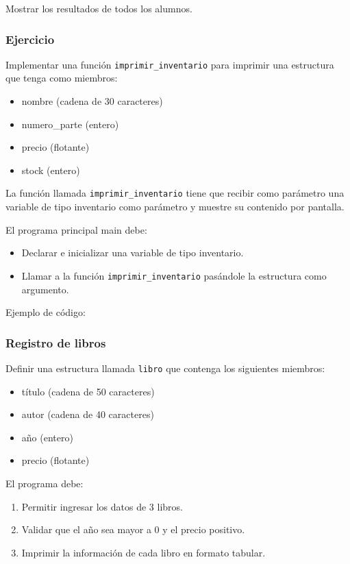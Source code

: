 Mostrar los resultados de todos los alumnos.

\subsubsection{Ejercicio}
Implementar una función \texttt{imprimir\_inventario} para imprimir una estructura que tenga como miembros:

\begin{itemize}
  \item nombre (cadena de 30 caracteres)
  \item numero\_parte (entero)
  \item precio (flotante)
  \item stock (entero)
\end{itemize}

La función llamada \texttt{imprimir\_inventario} tiene que recibir como parámetro una variable de tipo inventario como parámetro y muestre su contenido por pantalla.

El programa principal main debe:

\begin{itemize}
  \item Declarar e inicializar una variable de tipo inventario.
  \item 
Llamar a la función \texttt{imprimir\_inventario} pasándole la estructura como argumento.
\end{itemize}

Ejemplo de código:
\lstset{inputencoding=utf8/latin1}


\subsubsection{Registro de libros}

Definir una estructura llamada \texttt{libro} que contenga los siguientes miembros:

\begin{itemize}
\item título (cadena de 50 caracteres)
\item autor (cadena de 40 caracteres)
\item año (entero)
\item precio (flotante)
\end{itemize}

El programa debe:

\begin{enumerate}
\item Permitir ingresar los datos de 3 libros.
\item Validar que el año sea mayor a 0 y el precio positivo.
\item Imprimir la información de cada libro en formato tabular.
\end{enumerate}

